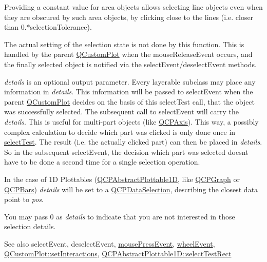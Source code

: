 Providing a constant value for area objects allows selecting line objects even when they are obscured by such area objects, by clicking close to the lines (i.\+e. closer than 0.$\ast$selection\+Tolerance).

The actual setting of the selection state is not done by this function. This is handled by the parent \hyperlink{classQCustomPlot}{Q\+Custom\+Plot} when the mouse\+Release\+Event occurs, and the finally selected object is notified via the select\+Event/deselect\+Event methods.

{\itshape details} is an optional output parameter. Every layerable subclass may place any information in {\itshape details}. This information will be passed to select\+Event when the parent \hyperlink{classQCustomPlot}{Q\+Custom\+Plot} decides on the basis of this select\+Test call, that the object was successfully selected. The subsequent call to select\+Event will carry the {\itshape details}. This is useful for multi-\/part objects (like \hyperlink{classQCPAxis}{Q\+C\+P\+Axis}). This way, a possibly complex calculation to decide which part was clicked is only done once in \hyperlink{classQCPAbstractItem_ae41d0349d68bb802c49104afd100ba2a}{select\+Test}. The result (i.\+e. the actually clicked part) can then be placed in {\itshape details}. So in the subsequent select\+Event, the decision which part was selected doesn\textquotesingle{}t have to be done a second time for a single selection operation.

In the case of 1D Plottables (\hyperlink{classQCPAbstractPlottable1D}{Q\+C\+P\+Abstract\+Plottable1D}, like \hyperlink{classQCPGraph}{Q\+C\+P\+Graph} or \hyperlink{classQCPBars}{Q\+C\+P\+Bars}) {\itshape details} will be set to a \hyperlink{classQCPDataSelection}{Q\+C\+P\+Data\+Selection}, describing the closest data point to {\itshape pos}.

You may pass 0 as {\itshape details} to indicate that you are not interested in those selection details.

\begin{DoxySeeAlso}{See also}
select\+Event, deselect\+Event, \hyperlink{classQCPLayerable_af6567604818db90f4fd52822f8bc8376}{mouse\+Press\+Event}, \hyperlink{classQCPLayerable_a47dfd7b8fd99c08ca54e09c362b6f022}{wheel\+Event}, \hyperlink{classQCustomPlot_a5ee1e2f6ae27419deca53e75907c27e5}{Q\+Custom\+Plot\+::set\+Interactions}, \hyperlink{classQCPAbstractPlottable1D_a22377bf6e57ab7eedbc9e489250c6ded}{Q\+C\+P\+Abstract\+Plottable1\+D\+::select\+Test\+Rect} 
\end{DoxySeeAlso}


